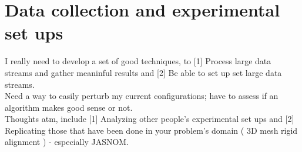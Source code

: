 \documentclass{article}
\begin{document}
\section{Data collection and experimental set ups }
I really need to develop a set of good techniques, to [1] Process large data streams and gather meaninful results and [2] Be able to set up set large data streams. \\
Need a way to easily perturb my current configurations; have to assess if an algorithm makes good sense or not. \\
Thoughts atm, include [1] Analyzing other people's experimental set ups and [2] Replicating those that have been done in your problem's domain ( 3D mesh rigid alignment ) - especially JASNOM.
\end{document}
